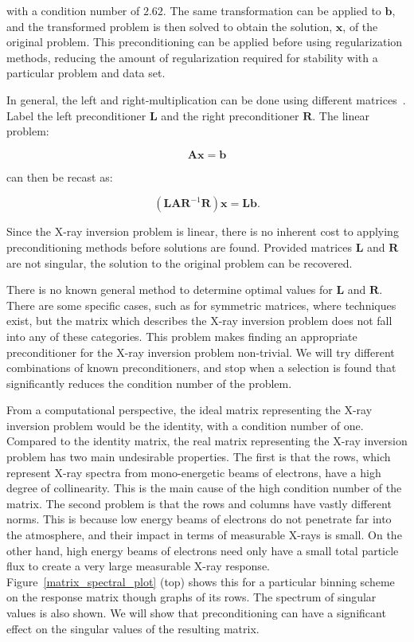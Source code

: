 with a condition number of $2.62$. The same transformation can be applied to $\mathbf{b}$, and the transformed problem is then solved to obtain the solution, $\mathbf{x}$, of the original problem. This preconditioning can be applied before using regularization methods, reducing the amount of regularization required for stability with a  particular problem and data set. 

In general, the left and right-multiplication can be done using different matrices~\citep{Bouwmeester2015}. Label the left preconditioner $\mathbf{L}$ and the right preconditioner $\mathbf{R}$. The linear problem:

$$\mathbf{A}\mathbf{x} = \mathbf{b}$$

can then be recast as:

$$(\mathbf{L}\mathbf{A}\mathbf{R}^{-1}\mathbf{R})\mathbf{x} = \mathbf{L}\mathbf{b}.$$

Since the X-ray inversion problem is linear, there is no inherent cost to applying preconditioning methods before solutions are found. Provided matrices $\mathbf{L}$ and $\mathbf{R}$ are not singular, the solution to the original problem can be recovered. 

There is no known general method to determine optimal values for $\mathbf{L}$ and $\mathbf{R}$. There are some specific cases, such as for symmetric matrices, where techniques exist, but the matrix which describes the X-ray inversion problem does not fall into any of these categories. This problem makes finding an appropriate preconditioner for the X-ray inversion problem non-trivial. We will try different combinations of known preconditioners, and stop when a selection is found that significantly reduces the condition number of the problem. 

From a computational perspective, the ideal matrix representing the X-ray inversion problem would be the identity, with a condition number of one. Compared to the identity matrix, the real matrix representing the X-ray inversion problem has two main undesirable properties. The first is that the rows, which represent X-ray spectra from mono-energetic beams of electrons, have a high degree of collinearity. This is the main cause of the high condition number of the matrix. The second problem is that the rows and columns have vastly different norms. This is because low energy beams of electrons do not penetrate far into the atmosphere, and their impact in terms of measurable X-rays is small. On the other hand, high energy beams of electrons need only have a small total particle flux to create a very large measurable X-ray response. Figure~\ref{matrix_spectral_plot} (top) shows this for a particular binning scheme on the response matrix though graphs of its rows. The spectrum of singular values is also shown. We will show that preconditioning can have a significant effect on the singular values of the resulting matrix. 

